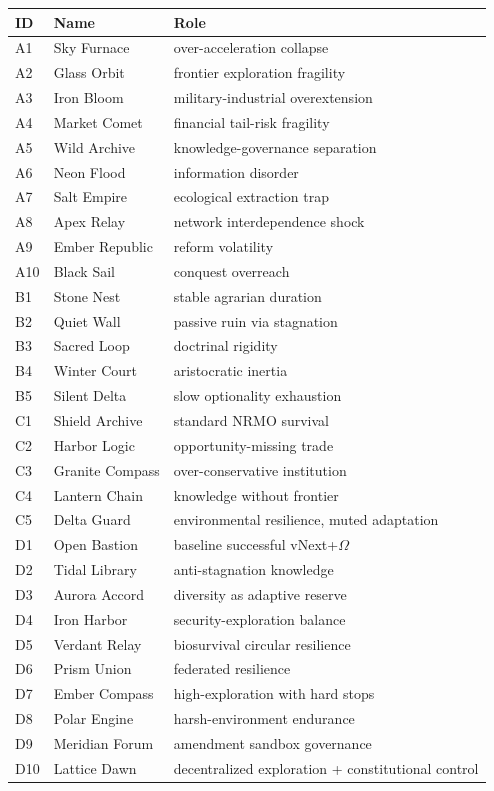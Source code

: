 \documentclass[11pt,a4paper]{article}
\theoremstyle{definition}\newtheorem{definition}{Definition}[section]
\begin{document}
\begin{longtable}{@{}llp{7cm}@{}}\toprule
ID&Name&Role\\\midrule\endhead
A1&Sky Furnace&over-acceleration collapse\\A2&Glass Orbit&frontier exploration fragility\\
A3&Iron Bloom&military-industrial overextension\\A4&Market Comet&financial tail-risk fragility\\
A5&Wild Archive&knowledge-governance separation\\A6&Neon Flood&information disorder\\
A7&Salt Empire&ecological extraction trap\\A8&Apex Relay&network interdependence shock\\
A9&Ember Republic&reform volatility\\A10&Black Sail&conquest overreach\\
B1&Stone Nest&stable agrarian duration\\B2&Quiet Wall&passive ruin via stagnation\\
B3&Sacred Loop&doctrinal rigidity\\B4&Winter Court&aristocratic inertia\\
B5&Silent Delta&slow optionality exhaustion\\
C1&Shield Archive&standard NRMO survival\\C2&Harbor Logic&opportunity-missing trade\\
C3&Granite Compass&over-conservative institution\\C4&Lantern Chain&knowledge without frontier\\
C5&Delta Guard&environmental resilience, muted adaptation\\
D1&Open Bastion&baseline successful vNext+$\Omega$\\D2&Tidal Library&anti-stagnation knowledge\\
D3&Aurora Accord&diversity as adaptive reserve\\D4&Iron Harbor&security-exploration balance\\
D5&Verdant Relay&biosurvival circular resilience\\D6&Prism Union&federated resilience\\
D7&Ember Compass&high-exploration with hard stops\\D8&Polar Engine&harsh-environment endurance\\
D9&Meridian Forum&amendment sandbox governance\\D10&Lattice Dawn&decentralized exploration + constitutional control\\
\bottomrule\end{longtable}
\end{document}
